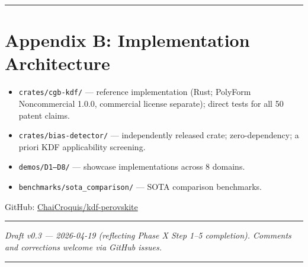 \begin{center}\rule{0.5\linewidth}{0.5pt}\end{center}

\section*{Appendix B: Implementation Architecture}\label{appendix-b-implementation-architecture}

\begin{itemize}
\tightlist
\item
  \texttt{crates/cgb-kdf/} --- reference implementation (Rust; PolyForm Noncommercial 1.0.0, commercial license separate); direct tests for all 50 patent claims.
\item
  \texttt{crates/bias-detector/} --- independently released crate; zero-dependency; a priori KDF applicability screening.
\item
  \texttt{demos/D1–D8/} --- showcase implementations across 8 domains.
\item
  \texttt{benchmarks/sota\_comparison/} --- SOTA comparison benchmarks.
\end{itemize}

GitHub: \href{https://github.com/ChaiCroquis/kdf-perovskite}{ChaiCroquis/kdf-perovskite}

\begin{center}\rule{0.5\linewidth}{0.5pt}\end{center}

\emph{Draft v0.3 --- 2026-04-19 (reflecting Phase X Step 1--5 completion). Comments and corrections welcome via GitHub issues.}

\begin{center}\rule{0.5\linewidth}{0.5pt}\end{center}
